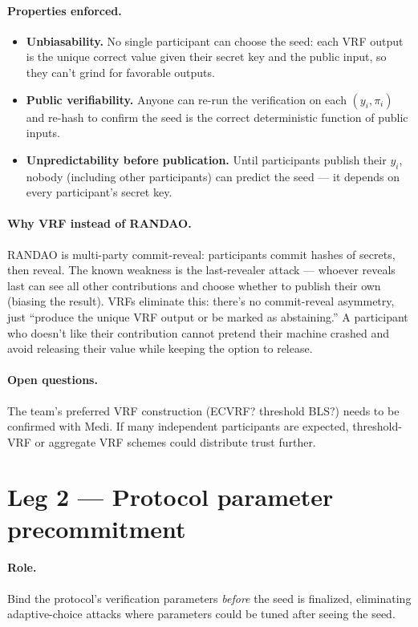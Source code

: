 \documentclass[11pt]{article}
\begin{document}
\paragraph{Properties enforced.}
\begin{itemize}
    \item \textbf{Unbiasability.} No single participant can choose the seed: each VRF output is the unique correct value given their secret key and the public input, so they can't grind for favorable outputs.
    \item \textbf{Public verifiability.} Anyone can re-run the verification on each $(y_i, \pi_i)$ and re-hash to confirm the seed is the correct deterministic function of public inputs.
    \item \textbf{Unpredictability before publication.} Until participants publish their $y_i$, nobody (including other participants) can predict the seed --- it depends on every participant's secret key.
\end{itemize}

\paragraph{Why VRF instead of RANDAO.} RANDAO is multi-party commit-reveal: participants commit hashes of secrets, then reveal. The known weakness is the last-revealer attack --- whoever reveals last can see all other contributions and choose whether to publish their own (biasing the result). VRFs eliminate this: there's no commit-reveal asymmetry, just ``produce the unique VRF output or be marked as abstaining.'' A participant who doesn't like their contribution cannot pretend their machine crashed and avoid releasing their value while keeping the option to release.

\paragraph{Open questions.} The team's preferred VRF construction (ECVRF? threshold BLS?) needs to be confirmed with Medi. If many independent participants are expected, threshold-VRF or aggregate VRF schemes could distribute trust further.

\section{Leg 2 --- Protocol parameter precommitment}

\paragraph{Role.} Bind the protocol's verification parameters \emph{before} the seed is finalized, eliminating adaptive-choice attacks where parameters could be tuned after seeing the seed.
\end{document}
